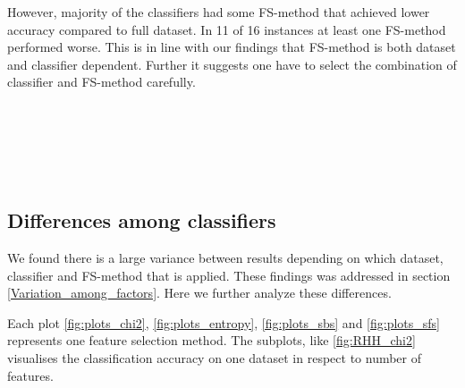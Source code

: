 However, majority of the classifiers had some FS-method that achieved lower accuracy compared to full dataset. In 11 of 16 instances at least one FS-method performed worse. This is in line with our findings that FS-method is both dataset and classifier dependent. Further it suggests one have to select the combination of classifier and FS-method carefully.

\begin{table}[h]
  
  \caption[]%
  {{\small Classification accuracy achieved by ANN was improved on all datasets by the use of some feature selection method.}}
  \label{table:ANN}
\end{table}

\begin{table}[h]
   \\
  \caption[]%
  {{\small All datasets except MIAS benefited from feature selection using CART Decision Tree classifier.}}
  \label{table:CART}
\end{table}

\begin{table}[h]
   \\
  \caption[]%
  {{\small Naive Bayes sees improvement or equivalent accuracy by feature selection on every dataset.}}
  \label{table:NB}
\end{table}

\begin{table}[h]
   \\
  \caption[]%
  {{\small Classification accuracy achieved by SVM was improved or equivalent on every dataset with use of feature selection.}}
  \label{table:SVM}
\end{table}


\subsection{Differences among classifiers}

We found there is a large variance between results depending on which dataset, classifier and FS-method that is applied. These findings was addressed in section \ref{Variation_among_factors}. Here we further analyze these differences.

Each plot \ref{fig:plots_chi2}, \ref{fig:plots_entropy}, \ref{fig:plots_sbs} and \ref{fig:plots_sfs} represents one feature selection method. The subplots, like \ref{fig:RHH_chi2} visualises the classification accuracy on one dataset in respect to number of features.

